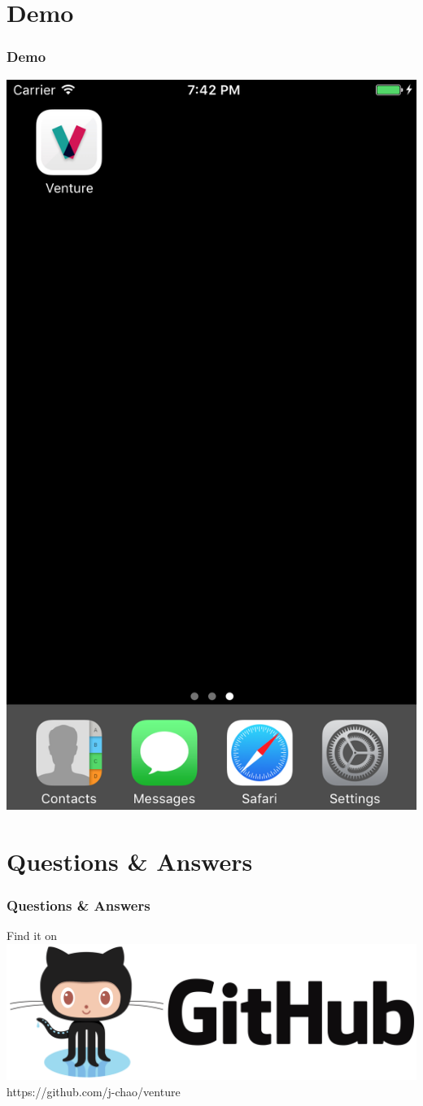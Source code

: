 \documentclass{beamer}
\begin{document}
\section{Demo}
\begin{frame}
\frametitle{Demo}
    \begin{center}
        \includegraphics[scale=0.33]{home}
    \end{center}
\end{frame}

\section{Questions \& Answers}
\begin{frame}
\frametitle{Questions \& Answers}
    \begin{center}
        Find it on \\
        \includegraphics[scale=0.08]{github} \\
        https://github.com/j-chao/venture
    \end{center}
\end{frame}
\end{document}
